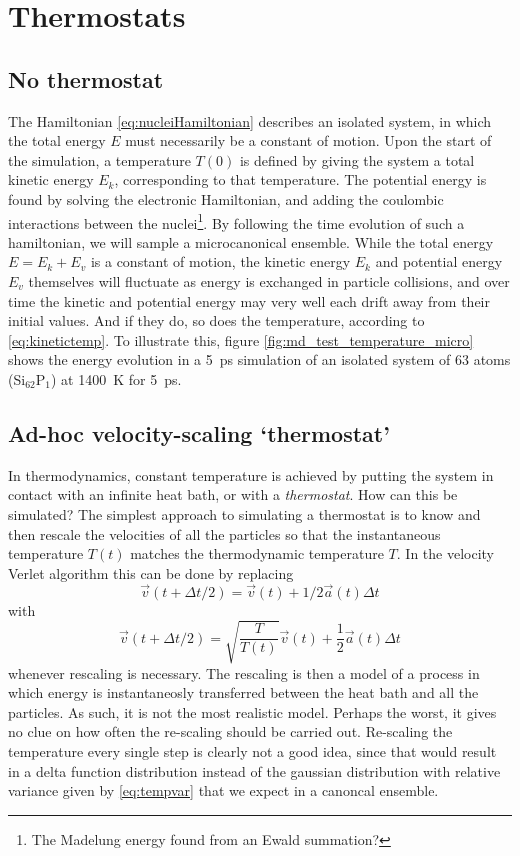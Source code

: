 \documentclass[11pt,bibliography=totoc,index=totoc]{scrbook}   %
\begin{document}
\section{Thermostats}

\subsection{No thermostat}

The Hamiltonian \eqref{eq:nucleiHamiltonian} describes an isolated system, in which the total energy $E$ must necessarily be a constant of motion.
Upon the start of the simulation, a temperature $T(0)$ is defined by giving the system a total kinetic energy $E_k$, corresponding to that temperature. The potential energy is found by solving the electronic Hamiltonian, and adding the coulombic interactions between the nuclei\footnote{The Madelung energy found from an Ewald summation?}.
By following the time evolution of such a hamiltonian, we will sample a microcanonical ensemble. 
While the total energy $E=E_k+E_v$ is a constant of motion, the kinetic energy $E_k$ and potential energy $E_v$ themselves will fluctuate as energy is exchanged in particle collisions, and over time the kinetic and potential energy may very well each drift away from their initial values. 
And if they do, so does the temperature, according to \eqref{eq:kinetictemp}. 
To illustrate this, figure \ref{fig:md_test_temperature_micro} shows the energy evolution in a 5~ps simulation of an isolated system of 63 atoms (Si$_{62}$P$_1$) at 1400~K for 5~ps.

\subsection{Ad-hoc velocity-scaling `thermostat'}

In thermodynamics, constant temperature is achieved by putting the system in contact with an infinite heat bath, or with a \emph{thermostat}.
How can this be simulated?
The simplest approach to simulating a thermostat is to know and then rescale the velocities of all the particles so that the instantaneous temperature $T(t)$ matches the thermodynamic temperature $T$. In the velocity Verlet algorithm this can be done by replacing
\begin{equation}
  \vec{v}\left(t+\Delta t/2\right) = \vec{v}(t) + 1/2 \vec{a}(t) \Delta t
\end{equation}
with
\begin{equation}
  \vec{v}(t+\Delta t/2) = \sqrt{\frac{T}{T(t)}} \vec{v}(t) + \frac12 \vec{a}(t)\Delta t
\end{equation}
whenever rescaling is necessary.
The rescaling is then a model of a process in which energy is instantaneosly transferred between the heat bath and all the particles. 
As such, it is not the most realistic model. 
Perhaps the worst, it gives no clue on how often the re-scaling should be carried out. 
Re-scaling the temperature every single step is clearly not a good idea, since that would result in a delta function distribution instead of the gaussian distribution with relative variance given by \eqref{eq:tempvar} that we expect in a canoncal ensemble.
\end{document}
